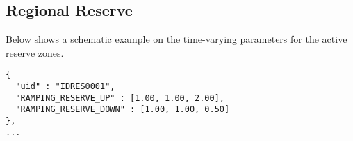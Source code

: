 
\subsection{Regional Reserve}
\label{sec:reserve_time}
Below shows a schematic example on the time-varying parameters for the active reserve zones.

\begin{verbatim}
{
  "uid" : "IDRES0001",
  "RAMPING_RESERVE_UP" : [1.00, 1.00, 2.00],
  "RAMPING_RESERVE_DOWN" : [1.00, 1.00, 0.50]
},
...
\end{verbatim}


